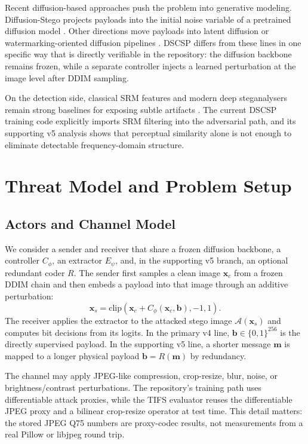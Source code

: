 \documentclass[journal]{IEEEtran}
\begin{document}
Recent diffusion-based approaches push the problem into generative modeling. Diffusion-Stego projects payloads into the initial noise variable of a pretrained diffusion model \cite{wei2023diffusionstego}. Other directions move payloads into latent diffusion or watermarking-oriented diffusion pipelines \cite{zhang2024ldstega,zhao2024dero}. DSCSP differs from these lines in one specific way that is directly verifiable in the repository: the diffusion backbone remains frozen, while a separate controller injects a learned perturbation at the image level after DDIM sampling.

On the detection side, classical SRM features and modern deep steganalysers remain strong baselines for exposing subtle artifacts \cite{fridrich2012rich,boroumand2019deep}. The current DSCSP training code explicitly imports SRM filtering into the adversarial path, and its supporting v5 analysis shows that perceptual similarity alone is not enough to eliminate detectable frequency-domain structure.

\section{Threat Model and Problem Setup}
\subsection{Actors and Channel Model}
We consider a sender and receiver that share a frozen diffusion backbone, a controller $C_{\phi}$, an extractor $E_{\psi}$, and, in the supporting v5 branch, an optional redundant coder $R$. The sender first samples a clean image $\mathbf{x}_c$ from a frozen DDIM chain and then embeds a payload into that image through an additive perturbation:
\begin{equation}
\mathbf{x}_s = \mathrm{clip}\!\left(\mathbf{x}_c + C_{\phi}(\mathbf{x}_c,\mathbf{b}), -1, 1\right).
\end{equation}
The receiver applies the extractor to the attacked stego image $\mathcal{A}(\mathbf{x}_s)$ and computes bit decisions from its logits. In the primary v4 line, $\mathbf{b}\in\{0,1\}^{256}$ is the directly supervised payload. In the supporting v5 line, a shorter message $\mathbf{m}$ is mapped to a longer physical payload $\mathbf{b}=R(\mathbf{m})$ by redundancy.

The channel may apply JPEG-like compression, crop-resize, blur, noise, or brightness/contrast perturbations. The repository's training path uses differentiable attack proxies, while the TIFS evaluator reuses the differentiable JPEG proxy and a bilinear crop-resize operator at test time. This detail matters: the stored JPEG Q75 numbers are proxy-codec results, not measurements from a real Pillow or libjpeg round trip.
\end{document}
